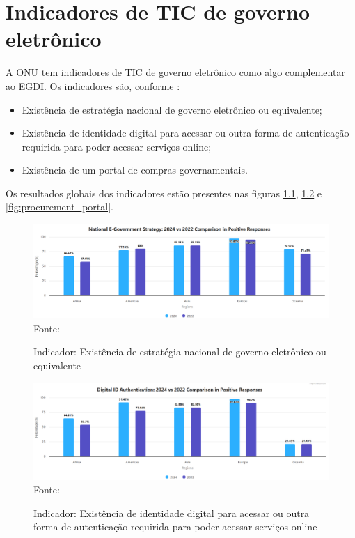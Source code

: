 \chapter{Indicadores de TIC de governo eletrônico}
\label{indicadores_tic_egov}

A ONU tem \href{https://publicadministration.un.org/egovkb/en-us/Data/ICT-in-government}{indicadores de TIC de governo eletrônico} como algo complementar ao \hyperref[egdi]{EGDI}. Os indicadores são, conforme \cite{ONU_ICT_in_government_indicators}:

\begin{itemize}
	\item Existência de estratégia nacional de governo eletrônico ou equivalente;
	\item Existência de identidade digital para acessar ou outra forma de autenticação requirida para poder acessar serviços online;
	\item Existência de um portal de compras governamentais.
\end{itemize}

Os resultados globais dos indicadores estão presentes nas figuras \ref{fig:national_government_strategy}, \ref{fig:national_identity} e \ref{fig:procurement_portal}.

\begin{figure}[H]
	\centering
	\caption{Indicador: Existência de estratégia nacional de governo eletrônico ou equivalente}
	\includegraphics[width=1\linewidth]{figuras/ict_in_government/national_government_strategy}
	\label{fig:national_government_strategy}
	\footnotesize{Fonte: \cite{ONU_ICT_in_government_indicators}}
\end{figure}

\begin{figure}[H]
	\centering
	\caption{Indicador: Existência de identidade digital para acessar ou outra forma de autenticação requirida para poder acessar serviços online}
	\includegraphics[width=1\linewidth]{figuras/ict_in_government/digital_identity}
	\label{fig:national_identity}
	\footnotesize{Fonte: \cite{ONU_ICT_in_government_indicators}}
\end{figure}

